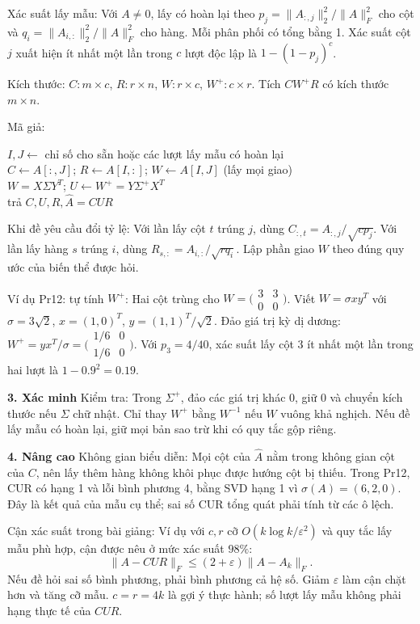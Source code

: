 \documentclass[10pt,a4paper,twocolumn]{article}
\makeatletter
\newcommand{\key}[1]{#1:\enspace}
\newcommand{\unitheading}[2]{%
  \par\addvspace{1pt}\noindent\textbf{#1. #2}\enspace}
\newcommand{\unitverification}{\unitheading{3}{Xác minh}}
\newcommand{\unitadvanced}{\unitheading{4}{Nâng cao}}
\newenvironment{algpseudo}{%
  \par\addvspace{2pt}\noindent
  \setlength{\parskip}{0pt}%
  Mã giả:\par\nobreak
  \begin{list}{}{\setlength{\leftmargin}{1em}\setlength{\topsep}{0pt}%
    \setlength{\partopsep}{0pt}\setlength{\parsep}{0pt}%
    \@beginparpenalty=10000\relax}%
  \item\relax
}{\end{list}\par\addvspace{3pt}}
\makeatother
\begin{document}
\key{Xác suất lấy mẫu} Với $A\ne0$, lấy có hoàn lại theo $p_j=\|A_{:,j}\|_2^2/\|A\|_F^2$ cho cột và $q_i=\|A_{i,:}\|_2^2/\|A\|_F^2$ cho hàng. Mỗi phân phối có tổng bằng 1. Xác suất cột $j$ xuất hiện ít nhất một lần trong $c$ lượt độc lập là $1-(1-p_j)^c$.

\key{Kích thước} $C:m\times c$, $R:r\times n$, $W:r\times c$, $W^+:c\times r$. Tích $CW^+R$ có kích thước $m\times n$.

\begin{algpseudo}
$I,J\gets$ chỉ số cho sẵn hoặc các lượt lấy mẫu có hoàn lại\\
$C\gets A[:,J]$; $R\gets A[I,:]$; $W\gets A[I,J]$ (lấy mọi giao)\\
$W=X\Sigma Y^T$; $U\gets W^+=Y\Sigma^+X^T$\\
trả $C,U,R,\widehat A=CUR$
\end{algpseudo}

\key{Khi đề yêu cầu đổi tỷ lệ} Với lần lấy cột $t$ trúng $j$, dùng $C_{:,t}=A_{:,j}/\sqrt{cp_j}$. Với lần lấy hàng $s$ trúng $i$, dùng $R_{s,:}=A_{i,:}/\sqrt{rq_i}$. Lập phần giao $W$ theo đúng quy ước của biến thể được hỏi.

\key{Ví dụ Pr12: tự tính $W^+$} Hai cột trùng cho $W=\bigl(\begin{smallmatrix}3&3\\0&0\end{smallmatrix}\bigr)$. Viết $W=\sigma xy^T$ với $\sigma=3\sqrt2$, $x=(1,0)^T$, $y=(1,1)^T/\sqrt2$. Đảo giá trị kỳ dị dương: $W^+=yx^T/\sigma=\bigl(\begin{smallmatrix}1/6&0\\1/6&0\end{smallmatrix}\bigr)$. Với $p_3=4/40$, xác suất lấy cột 3 ít nhất một lần trong hai lượt là $1-0.9^2=0.19$.

\unitverification
\key{Kiểm tra} Trong $\Sigma^+$, đảo các giá trị khác 0, giữ 0 và chuyển kích thước nếu $\Sigma$ chữ nhật. Chỉ thay $W^+$ bằng $W^{-1}$ nếu $W$ vuông khả nghịch. Nếu đề lấy mẫu có hoàn lại, giữ mọi bản sao trừ khi có quy tắc gộp riêng.

\unitadvanced
\key{Không gian biểu diễn} Mọi cột của $\widehat A$ nằm trong không gian cột của $C$, nên lấy thêm hàng không khôi phục được hướng cột bị thiếu. Trong Pr12, CUR có hạng 1 và lỗi bình phương 4, bằng SVD hạng 1 vì $\sigma(A)=(6,2,0)$. Đây là kết quả của mẫu cụ thể; sai số CUR tổng quát phải tính từ các ô lệch.

\key{Cận xác suất trong bài giảng} Ví dụ với $c,r$ cỡ $O(k\log k/\varepsilon^2)$ và quy tắc lấy mẫu phù hợp, cận được nêu ở mức xác suất $98\%$:
\[
\|A-CUR\|_F\le (2+\varepsilon)\|A-A_k\|_F.
\]
Nếu đề hỏi sai số bình phương, phải bình phương cả hệ số. Giảm $\varepsilon$ làm cận chặt hơn và tăng cỡ mẫu. $c=r=4k$ là gợi ý thực hành; số lượt lấy mẫu không phải hạng thực tế của $CUR$.
\end{document}
